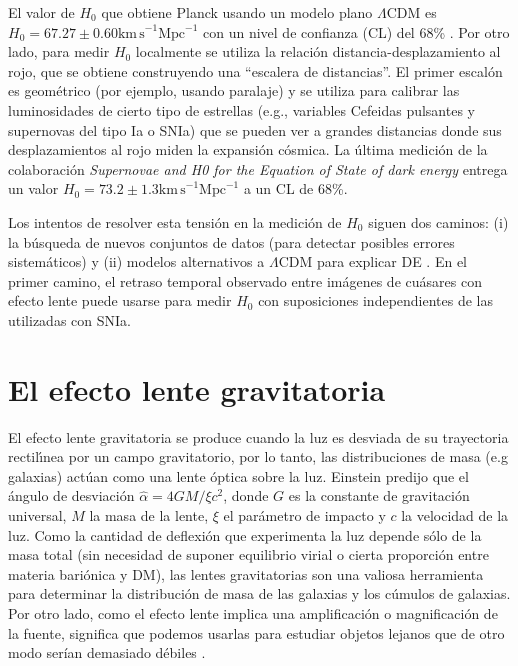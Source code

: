 \documentclass[baaa]{baaa}
\begin{document}
El valor de $H_0$ que obtiene Planck usando un modelo plano $\Lambda$CDM es $H_0 = 67.27 \pm 0.60 \mathrm{km\, s}^{-1} \mathrm{Mpc}^{-1}$ con un nivel de confianza (CL) del 68\%  \citep{planck2020}. Por otro lado, para medir $H_0$ localmente se utiliza la relaci\'on distancia-desplazamiento al rojo, que se obtiene construyendo una “escalera de distancias”. El primer escal\'on es geom\'etrico (por ejemplo, usando paralaje) y se utiliza para calibrar las luminosidades de cierto tipo de estrellas (e.g., variables Cefeidas pulsantes y supernovas del tipo Ia o SNIa) que se pueden ver a grandes distancias donde sus desplazamientos al rojo miden la expansión cósmica. La \'ultima medici\'on de la colaboraci\'on {\em Supernovae and H0 for the Equation of State of dark energy}  \citep[SH0ES,][]{riess2021} entrega un valor $H_0 = 73.2 \pm 1.3 \mathrm{km\, s}^{-1} \mathrm{Mpc}^{-1}$ a un CL de 68\%.

Los intentos de resolver esta tensi\'on en la medici\'on de $H_0$ siguen dos caminos: (i) la b\'usqueda de nuevos conjuntos de datos (para detectar posibles errores sistem\'aticos) y (ii) modelos alternativos a $\Lambda$CDM para explicar DE \citep{motta2021}. En el primer camino, el retraso temporal observado entre im\'agenes de cu\'asares con efecto lente puede usarse para medir $H_0$ con suposiciones independientes de las utilizadas con SNIa.


\section{El efecto lente gravitatoria}

El efecto lente gravitatoria se produce cuando la luz es desviada de su trayectoria rectil\'{\i}nea por un campo gravitatorio, por lo tanto, las distribuciones de masa (e.g galaxias) actúan como una lente óptica sobre la luz. Einstein predijo que el ángulo de desviación $\hat{\alpha}=4 G M/ \xi  c^2$, donde $G$ es la constante de gravitación universal, $M$ la masa de la lente, $\xi$ el parámetro de impacto y $c$ la velocidad de la luz. 
Como la cantidad de deflexión que experimenta la luz depende sólo de la masa total (sin necesidad de suponer equilibrio virial o cierta proporci\'on entre materia bari\'onica y DM), las lentes gravitatorias son una valiosa herramienta  para determinar la distribución de masa de las galaxias y los cúmulos de galaxias.  Por otro lado, como el efecto lente implica una amplificaci\'on o magnificaci\'on de la fuente, significa que podemos usarlas para estudiar objetos lejanos que de otro modo serían demasiado débiles \citep{caminha2022,katz2023}. 
\end{document}
